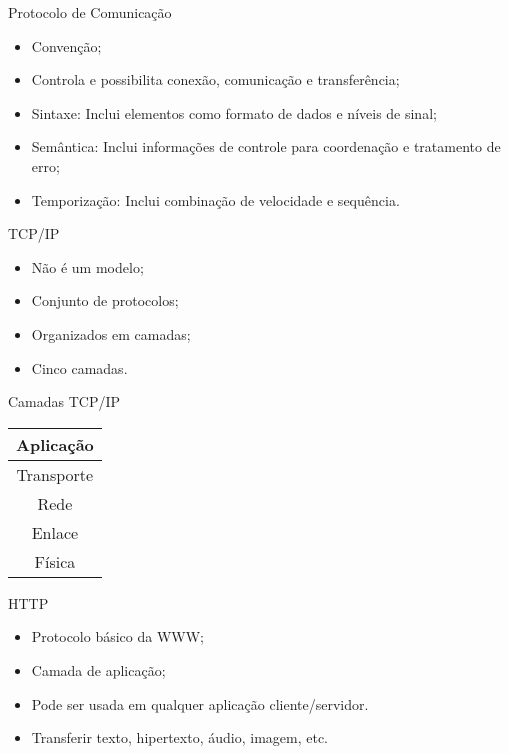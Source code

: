 \begin{frame}{Protocolo de Comunicação}
\begin{itemize}
\item Convenção; \pause
\item Controla e possibilita conexão, comunicação e transferência; \pause
\item Sintaxe: Inclui elementos como formato de dados e níveis de sinal; \pause
\item Semântica: Inclui informações de controle para coordenação e 
tratamento de erro; \pause
\item Temporização: Inclui combinação de velocidade e sequência. \pause
\end{itemize}
\end{frame}

\begin{frame}{TCP/IP}
	\begin{block}{}
		\begin{itemize}
			\item Não é um modelo; \pause
			\item Conjunto de protocolos; \pause
			\item Organizados em camadas; \pause
			\item Cinco camadas.
		\end{itemize}
	\end{block}
\end{frame}
\begin{frame}
	\begin{block}{Camadas TCP/IP}
			\centering
			\begin{table}
				\begin{tabular}{|c|}
					\hline
					Aplicação \\ \hline
					Transporte \\ \hline
					Rede \\ \hline
					Enlace\\ \hline
					Física\\ \hline
				\end{tabular}
			\end{table}
	\end{block}
\end{frame}


\begin{frame}{HTTP}
	\begin{itemize}
		\item Protocolo básico da WWW; \pause
		\item Camada de aplicação;
		\item Pode ser usada em qualquer aplicação cliente/servidor.
		\item Transferir texto, hipertexto, áudio, imagem, etc.
	\end{itemize}
\end{frame}
